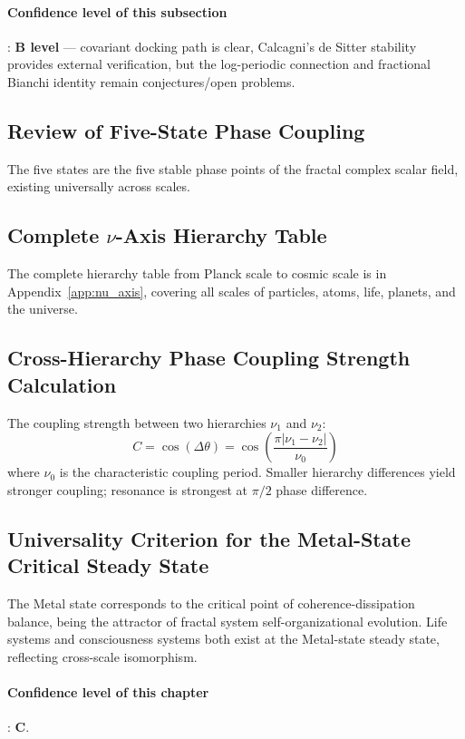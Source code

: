 \documentclass[12pt,a4paper,twocolumn]{article}
\begin{document}
\paragraph{Confidence level of this subsection}: \textbf{B level} --- covariant docking path is clear, Calcagni's de Sitter stability provides external verification, but the log-periodic connection and fractional Bianchi identity remain conjectures/open problems.

\subsection{Review of Five-State Phase Coupling}
The five states are the five stable phase points of the fractal complex scalar field, existing universally across scales.

\subsection{Complete $\nu$-Axis Hierarchy Table}
The complete hierarchy table from Planck scale to cosmic scale is in Appendix~\ref{app:nu_axis}, covering all scales of particles, atoms, life, planets, and the universe.

\subsection{Cross-Hierarchy Phase Coupling Strength Calculation}
The coupling strength between two hierarchies $\nu_1$ and $\nu_2$:
\[
C = \cos(\Delta\theta) = \cos\left( \frac{\pi |\nu_1-\nu_2|}{\nu_0} \right)
\]
where $\nu_0$ is the characteristic coupling period. Smaller hierarchy differences yield stronger coupling; resonance is strongest at $\pi/2$ phase difference.

\subsection{Universality Criterion for the Metal-State Critical Steady State}
The Metal state corresponds to the critical point of coherence-dissipation balance, being the attractor of fractal system self-organizational evolution. Life systems and consciousness systems both exist at the Metal-state steady state, reflecting cross-scale isomorphism.

\paragraph{Confidence level of this chapter}: \textbf{C}.
\end{document}
